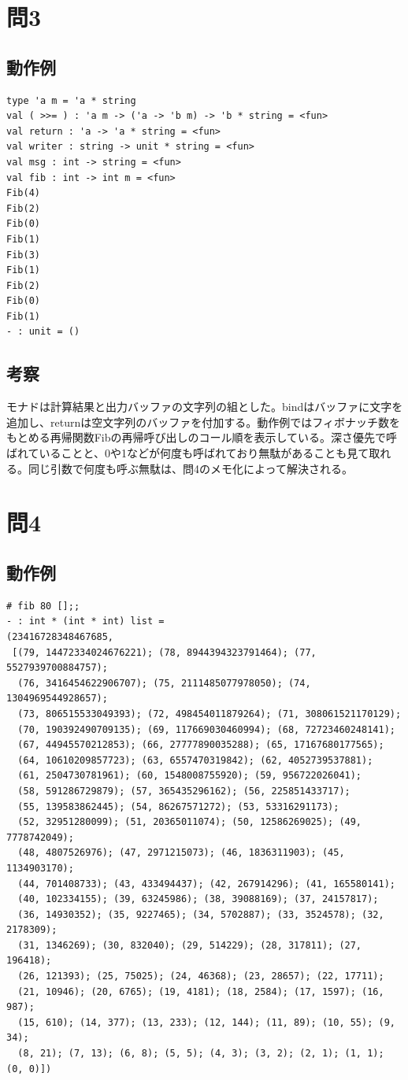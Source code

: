 \documentclass[11pt,a4paper]{jsarticle}
\begin{document}
\section*{問3}
\subsection*{動作例}
\begin{lstlisting}[basicstyle=\ttfamily\footnotesize, frame=single]
type 'a m = 'a * string
val ( >>= ) : 'a m -> ('a -> 'b m) -> 'b * string = <fun>
val return : 'a -> 'a * string = <fun>
val writer : string -> unit * string = <fun>
val msg : int -> string = <fun>
val fib : int -> int m = <fun>
Fib(4)
Fib(2)
Fib(0)
Fib(1)
Fib(3)
Fib(1)
Fib(2)
Fib(0)
Fib(1)
- : unit = ()
\end{lstlisting}
\subsection*{考察}
モナドは計算結果と出力バッファの文字列の組とした。bindはバッファに文字を追加し、returnは空文字列のバッファを付加する。動作例ではフィボナッチ数をもとめる再帰関数Fibの再帰呼び出しのコール順を表示している。深さ優先で呼ばれていることと、0や1などが何度も呼ばれており無駄があることも見て取れる。同じ引数で何度も呼ぶ無駄は、問4のメモ化によって解決される。
\section*{問4}
\subsection*{動作例}
\begin{lstlisting}[basicstyle=\ttfamily\footnotesize, frame=single]
# fib 80 [];;
- : int * (int * int) list =
(23416728348467685,
 [(79, 14472334024676221); (78, 8944394323791464); (77, 5527939700884757);
  (76, 3416454622906707); (75, 2111485077978050); (74, 1304969544928657);
  (73, 806515533049393); (72, 498454011879264); (71, 308061521170129);
  (70, 190392490709135); (69, 117669030460994); (68, 72723460248141);
  (67, 44945570212853); (66, 27777890035288); (65, 17167680177565);
  (64, 10610209857723); (63, 6557470319842); (62, 4052739537881);
  (61, 2504730781961); (60, 1548008755920); (59, 956722026041);
  (58, 591286729879); (57, 365435296162); (56, 225851433717);
  (55, 139583862445); (54, 86267571272); (53, 53316291173);
  (52, 32951280099); (51, 20365011074); (50, 12586269025); (49, 7778742049);
  (48, 4807526976); (47, 2971215073); (46, 1836311903); (45, 1134903170);
  (44, 701408733); (43, 433494437); (42, 267914296); (41, 165580141);
  (40, 102334155); (39, 63245986); (38, 39088169); (37, 24157817);
  (36, 14930352); (35, 9227465); (34, 5702887); (33, 3524578); (32, 2178309);
  (31, 1346269); (30, 832040); (29, 514229); (28, 317811); (27, 196418);
  (26, 121393); (25, 75025); (24, 46368); (23, 28657); (22, 17711);
  (21, 10946); (20, 6765); (19, 4181); (18, 2584); (17, 1597); (16, 987);
  (15, 610); (14, 377); (13, 233); (12, 144); (11, 89); (10, 55); (9, 34);
  (8, 21); (7, 13); (6, 8); (5, 5); (4, 3); (3, 2); (2, 1); (1, 1); (0, 0)])
\end{lstlisting}
\end{document}

